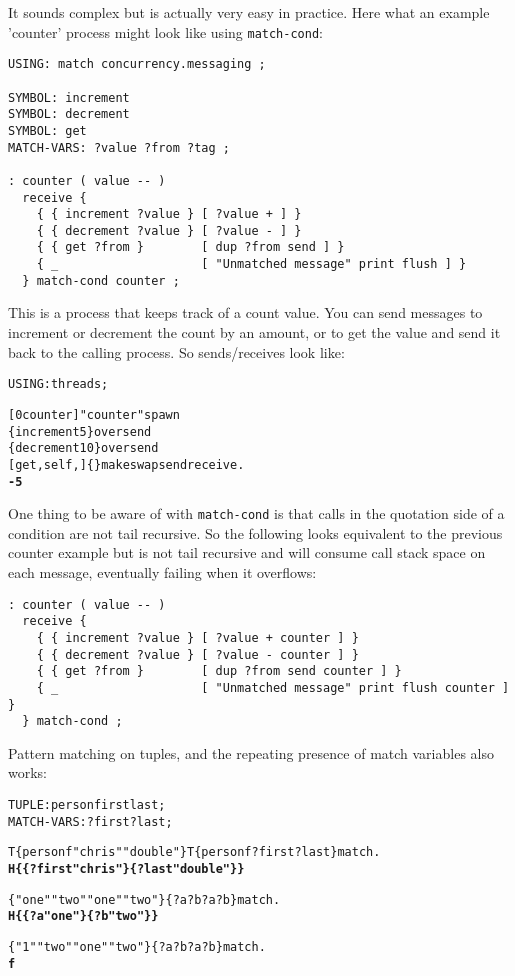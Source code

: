 
It sounds complex but is actually very easy in practice. Here what an
example 'counter' process might look like using \verb|match-cond|:

\begin{verbatim}
USING: match concurrency.messaging ;

SYMBOL: increment
SYMBOL: decrement
SYMBOL: get
MATCH-VARS: ?value ?from ?tag ;

: counter ( value -- )
  receive {
    { { increment ?value } [ ?value + ] }
    { { decrement ?value } [ ?value - ] }
    { { get ?from }        [ dup ?from send ] }
    { _                    [ "Unmatched message" print flush ] }
  } match-cond counter ;
\end{verbatim}

This is a process that keeps track of a count value. You can send
messages to increment or decrement the count by an amount, or to get
the value and send it back to the calling process. So sends/receives
look like:

\begin{alltt}
USING: threads ;

[ 0 counter ] "counter" spawn
\{ increment 5 \} over send
\{ decrement 10 \} over send
[ get , self , ] \{ \} make swap send receive .
  \textbf{-5}
\end{alltt}

One thing to be aware of with \verb|match-cond| is that calls in the
quotation side of a condition are not tail recursive. So the following
looks equivalent to the previous counter example but is not tail
recursive and will consume call stack space on each message,
eventually failing when it overflows:

\begin{verbatim}
: counter ( value -- )
  receive {
    { { increment ?value } [ ?value + counter ] }
    { { decrement ?value } [ ?value - counter ] }
    { { get ?from }        [ dup ?from send counter ] }
    { _                    [ "Unmatched message" print flush counter ] }
  } match-cond ;
\end{verbatim}

Pattern matching on tuples, and the repeating presence of match
variables also works:

\begin{alltt}
TUPLE: person first last ;
MATCH-VARS: ?first ?last ;

T\{ person f "chris" "double" \} T\{ person f ?first ?last \} match .
  \textbf{H\{ \{ ?first "chris" \} \{ ?last "double" \} \}}

\{ "one" "two" "one" "two" \} \{ ?a ?b ?a ?b \} match .
  \textbf{H\{ \{ ?a "one" \} \{ ?b "two" \} \}}

\{ "1" "two" "one" "two" \} \{ ?a ?b ?a ?b \} match .
  \textbf{f}
\end{alltt}
